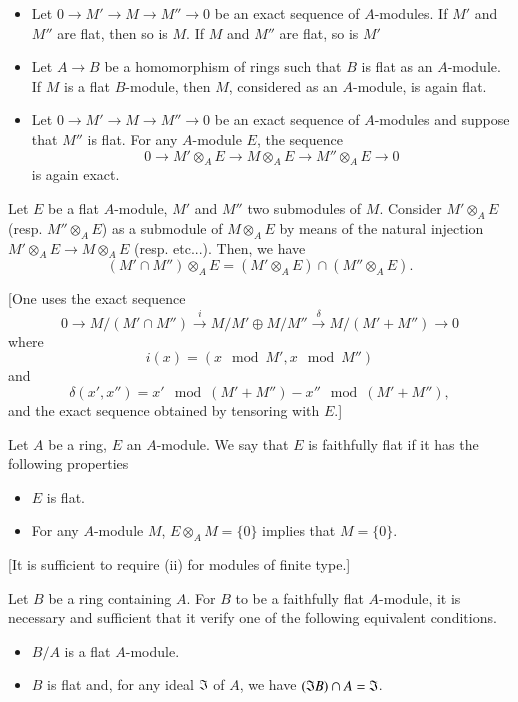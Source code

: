 \begin{proposition}\label{chap3-prop4.4}
\begin{itemize}
\item[\rm(i)] Let $0\to M'\to M\to M''\to 0$ be an exact sequence of $A$-modules. If $M'$ and $M''$ are flat, then so is $M$. If $M$ and $M''$ are flat, so is $M'$

\item[\rm(ii)] Let $A\to B$ be a homomorphism of rings such that $B$ is flat as an $A$-module. If $M$ is a flat $B$-module, then $M$, considered as an $A$-module, is again flat.

\item[\rm(iii)] Let $0\to M'\to M\to M''\to 0$ be an exact sequence of $A$-modules and suppose that $M''$ is flat. For any $A$-module $E$, the sequence
$$
0\to M'\otimes_{A}E\to M\otimes_{A}E\to M''\otimes_{A}E\to 0
$$
is again exact.
\end{itemize}
\end{proposition}

\begin{proposition}\label{chap3-prop4.5}
Let $E$ be a flat $A$-module, $M'$ and $M''$ two submodules of $M$. Consider $M'\otimes_{A}E$ (resp. $M''\otimes_{A}E$) as a submodule of $M\otimes_{A}E$ by means of the natural injection $M'\otimes_{A}E\to M\otimes_{A}E$ (resp. etc...). Then, we have
$$
(M'\cap M'')\otimes_{A}E=(M'\otimes_{A}E)\cap (M''\otimes_{A}E).
$$
\end{proposition}
[One uses the exact sequence
$$
0\to M/(M'\cap M'')\xrightarrow{i}M/M'\oplus M/M''\xrightarrow{\delta}M/(M'+M'')\to 0
$$
where
$$
i(x)=(x\mod M',x\mod M'')
$$
and
$$
\delta(x',x'')=x'\mod (M'+M'')-x''\mod (M'+M''),
$$
and the exact sequence obtained by tensoring with $E$.]

\begin{definition}\label{chap3-defi4.6}
Let $A$ be a ring, $E$ an $A$-module. We say that $E$ is faithfully flat if it has the following properties
\begin{itemize}
\item[\rm(i)] $E$ is flat.

\item[\rm(ii)] For any $A$-module $M$, $E\otimes_A M=\{0\}$ implies that $M=\{0\}$.
\end{itemize}
\end{definition}
[It is sufficient to require (ii) for modules of finite type.]

Let $B$ be a ring containing $A$. For $B$ to be a faithfully flat $A$-module, it is necessary and sufficient that it verify one of the following equivalent conditions.
\begin{itemize}
\item[(i)] $B/A$ is a flat $A$-module.

\item[(ii)] $B$ is flat and, for any ideal $\mathfrak{I}$ of $A$, we have $(\mathfrak{I} B)\cap A=\mathfrak{I}$.
\end{itemize}

